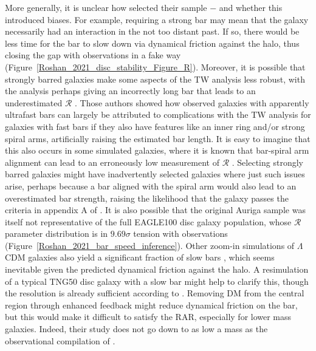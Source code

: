\documentclass[fleqn,usenatbib,useAMS]{mnras} %
\begin{document}
More generally, it is unclear how \citet{Fragkoudi_2021} selected their sample $-$ and whether this introduced biases. For example, requiring a strong bar may mean that the galaxy necessarily had an interaction in the not too distant past. If so, there would be less time for the bar to slow down via dynamical friction against the halo, thus closing the gap with observations in a fake way (Figure~\ref{Roshan_2021_disc_stability_Figure_R}). Moreover, it is possible that strongly barred galaxies make some aspects of the TW analysis less robust, with the analysis perhaps giving an incorrectly long bar that leads to an underestimated $\mathcal{R}$ \citep{Cuomo_2021}. Those authors showed how observed galaxies with apparently ultrafast bars can largely be attributed to complications with the TW analysis for galaxies with fast bars if they also have features like an inner ring and/or strong spiral arms, artificially raising the estimated bar length. It is easy to imagine that this also occurs in some simulated galaxies, where it is known that bar-spiral arm alignment can lead to an erroneously low measurement of $\mathcal{R}$ \citep{Hilmi_2020}. Selecting strongly barred galaxies might have inadvertently selected galaxies where just such issues arise, perhaps because a bar aligned with the spiral arm would also lead to an overestimated bar strength, raising the likelihood that the galaxy passes the criteria in appendix A of \citet{Fragkoudi_2021}. It is also possible that the original Auriga sample was itself not representative of the full EAGLE100 disc galaxy population, whose $\mathcal{R}$ parameter distribution is in $9.69\sigma$ tension with observations (Figure~\ref{Roshan_2021_bar_speed_inference}). Other zoom-in simulations of $\Lambda$CDM galaxies also yield a significant fraction of slow bars \citep[e.g.][]{Zana_2018, Zana_2019}, which seems inevitable given the predicted dynamical friction against the halo. A resimulation of a typical TNG50 disc galaxy with a slow bar might help to clarify this, though the resolution is already sufficient according to \citet{Fragkoudi_2021}. Removing DM from the central region through enhanced feedback might reduce dynamical friction on the bar, but this would make it difficult to satisfy the RAR, especially for lower mass galaxies. Indeed, their study does not go down to as low a mass as the observational compilation of \citet{Cuomo_2020}.
\end{document}
